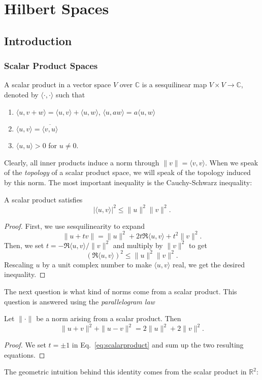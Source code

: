 \documentclass[twoside,symmetric, openany, 12pt]{./tuftebook}
\theoremstyle{definition}
\theoremstyle{definition}
\theoremstyle{definition}
\newenvironment{parts}{\begin{enumerate}[label=(\alph*)]}{\end{enumerate}}
\newcommand{\R}{\mathbb{R}}
\newcommand{\C}{\mathbb{C}}
\begin{document}
\chapter{Hilbert Spaces}
\section{Introduction}
\subsection{Scalar Product Spaces}
\begin{Definition}
	A scalar product in a vector space $V$ over $\C$ is a sesquilinear map $V\times V\to \C$, denoted by $\langle \cdot, \cdot \rangle$ such that
	\begin{parts}
		\item $\langle u, v+w\rangle =\langle u, v\rangle + \langle u, w\rangle$, $\langle u, aw\rangle = a\langle u, w\rangle$
		\item $\langle u, v\rangle = \overline{\langle v, u\rangle}$
		\item $\langle u, u\rangle>0$ for $u\neq 0$.
	\end{parts}
\end{Definition}
Clearly, all inner products induce a norm through $\|v\| = \langle v, v\rangle$. When we speak of the \emph{topology} of a scalar product space, we will speak of the topology induced by this norm. The most important inequality is the Cauchy-Schwarz inequality:
\begin{Theorem}
	A scalar product satisfies
	\[|\langle u, v \rangle|^2 \le \|u\|^2 \|v\|^2.\]
\end{Theorem}
\begin{proof}
	First, we use sesquilinearity to expand
	\begin{equation}
		\|u + tv\| = \|u\|^2 + 2t \Re\langle u, v\rangle +t^2 \|v\|^2.\label{eq:scalarproduct}
\end{equation}
	Then, we set $t=-\Re\langle u, v\rangle /\|v\|^2$ and multiply by $\|v\|^2$ to get
	\[(\Re\langle u,v\rangle)^2 \le \|u\|^2\|v\|^2.\]
	Rescaling $u$ by a unit complex number to make $\langle u, v\rangle$ real, we get the desired inequality.
\end{proof}
The next question is what kind of norms come from a scalar product. This question is answered using the \emph{parallelogram law}
\begin{Proposition}
	Let $\|\cdot\|$ be a norm arising from a scalar product. Then
	\[
	\|u+v\|^2 + \|u-v\|^2 = 2\|u\|^2 + 2\|v\|^2
	.\] 
\end{Proposition}
\begin{proof}
	We set $t=\pm 1$ in Eq.~\eqref{eq:scalarproduct} and sum up the two resulting equations.
\end{proof}
The geometric intuition behind this identity comes from the scalar product in $\R^2$:
\end{document}
